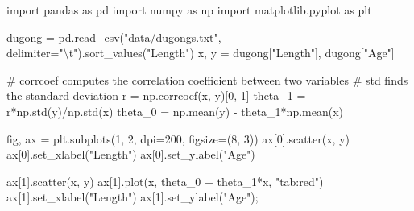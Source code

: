 \documentclass[
  letterpaper,
  DIV=11,
  numbers=noendperiod]{scrreprt}
\newenvironment{Shaded}{\begin{snugshade}}{\end{snugshade}}
\newcommand{\CharTok}[1]{\textcolor[rgb]{0.13,0.47,0.30}{#1}}
\newcommand{\CommentTok}[1]{\textcolor[rgb]{0.37,0.37,0.37}{#1}}
\newcommand{\DecValTok}[1]{\textcolor[rgb]{0.68,0.00,0.00}{#1}}
\newcommand{\ImportTok}[1]{\textcolor[rgb]{0.00,0.46,0.62}{#1}}
\newcommand{\NormalTok}[1]{\textcolor[rgb]{0.00,0.23,0.31}{#1}}
\newcommand{\OperatorTok}[1]{\textcolor[rgb]{0.37,0.37,0.37}{#1}}
\newcommand{\StringTok}[1]{\textcolor[rgb]{0.13,0.47,0.30}{#1}}
\begin{document}
\begin{Shaded}
\begin{Highlighting}[]
\ImportTok{import}\NormalTok{ pandas }\ImportTok{as}\NormalTok{ pd}
\ImportTok{import}\NormalTok{ numpy }\ImportTok{as}\NormalTok{ np}
\ImportTok{import}\NormalTok{ matplotlib.pyplot }\ImportTok{as}\NormalTok{ plt}

\NormalTok{dugong }\OperatorTok{=}\NormalTok{ pd.read\_csv(}\StringTok{"data/dugongs.txt"}\NormalTok{, delimiter}\OperatorTok{=}\StringTok{"}\CharTok{\textbackslash{}t}\StringTok{"}\NormalTok{).sort\_values(}\StringTok{"Length"}\NormalTok{)}
\NormalTok{x, y }\OperatorTok{=}\NormalTok{ dugong[}\StringTok{"Length"}\NormalTok{], dugong[}\StringTok{"Age"}\NormalTok{]}

\CommentTok{\# \textasciigrave{}corrcoef\textasciigrave{} computes the correlation coefficient between two variables}
\CommentTok{\# \textasciigrave{}std\textasciigrave{} finds the standard deviation}
\NormalTok{r }\OperatorTok{=}\NormalTok{ np.corrcoef(x, y)[}\DecValTok{0}\NormalTok{, }\DecValTok{1}\NormalTok{]}
\NormalTok{theta\_1 }\OperatorTok{=}\NormalTok{ r}\OperatorTok{*}\NormalTok{np.std(y)}\OperatorTok{/}\NormalTok{np.std(x)}
\NormalTok{theta\_0 }\OperatorTok{=}\NormalTok{ np.mean(y) }\OperatorTok{{-}}\NormalTok{ theta\_1}\OperatorTok{*}\NormalTok{np.mean(x)}

\NormalTok{fig, ax }\OperatorTok{=}\NormalTok{ plt.subplots(}\DecValTok{1}\NormalTok{, }\DecValTok{2}\NormalTok{, dpi}\OperatorTok{=}\DecValTok{200}\NormalTok{, figsize}\OperatorTok{=}\NormalTok{(}\DecValTok{8}\NormalTok{, }\DecValTok{3}\NormalTok{))}
\NormalTok{ax[}\DecValTok{0}\NormalTok{].scatter(x, y)}
\NormalTok{ax[}\DecValTok{0}\NormalTok{].set\_xlabel(}\StringTok{"Length"}\NormalTok{)}
\NormalTok{ax[}\DecValTok{0}\NormalTok{].set\_ylabel(}\StringTok{"Age"}\NormalTok{)}

\NormalTok{ax[}\DecValTok{1}\NormalTok{].scatter(x, y)}
\NormalTok{ax[}\DecValTok{1}\NormalTok{].plot(x, theta\_0 }\OperatorTok{+}\NormalTok{ theta\_1}\OperatorTok{*}\NormalTok{x, }\StringTok{"tab:red"}\NormalTok{)}
\NormalTok{ax[}\DecValTok{1}\NormalTok{].set\_xlabel(}\StringTok{"Length"}\NormalTok{)}
\NormalTok{ax[}\DecValTok{1}\NormalTok{].set\_ylabel(}\StringTok{"Age"}\NormalTok{)}\OperatorTok{;}
\end{Highlighting}
\end{Shaded}
\end{document}
